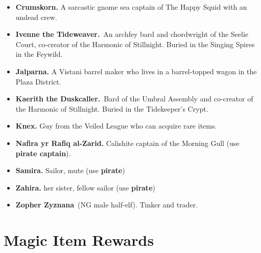 \documentclass[10pt,twocolumn]{article}
\renewcommand{\textsc}[1]{\XCharterSC#1}
\let\oldtextbf\textbf
\renewcommand{\textbf}[1]{\oldtextbf{{#1}}}
\providecommand{\tightlist}{
  \setlength{\itemsep}{4pt}
  \setlength{\topsep}{0pt}
  \setlength{\parsep}{0pt}
  \setlength{\parskip}{0pt}
  \setlength{\partopsep}{0pt}
}
\begin{document}
\begin{itemize}
\tightlist
\item
  \textbf{Crumskorn.} A sarcastic gnome sea captain of The Happy Squid
  with an undead crew.
\item
  \textbf{Ivenne the Tideweaver.}~An archfey bard and chordwright of the
  Seelie Court, co-creator of the Harmonic of Stillnight. Buried in the
  Singing Spires in the Feywild.
\item
  \textbf{Jalparna.} A Vistani barrel maker who lives in a barrel-topped
  wagon in the Plaza District.
\item
  \textbf{Kaerith the Duskcaller.}~Bard of the Umbral Assembly and
  co-creator of the Harmonic of Stillnight. Buried in the Tidekeeper's
  Crypt.
\item
  \textbf{Knex.} Guy from the Veiled League who can acquire rare items.
\item
  \textbf{Nafira yr Rafiq al-Zarid.} Calishite captain of the Morning
  Gull (use \textcolor{keywordcolor}{\textbf{\textsc{pirate captain}}}).
\item
  \textbf{Samira.} Sailor, mute (use
  \textcolor{keywordcolor}{\textbf{\textsc{pirate}}})
\item
  \textbf{Zahira.} her sister, fellow sailor (use
  \textcolor{keywordcolor}{\textbf{\textsc{pirate}}})
\item
  \textbf{Zopher Zyznana}~(NG male half-elf). Tinker and trader.
\end{itemize}

\section{Magic Item Rewards}\label{magic-item-rewards}
\end{document}
